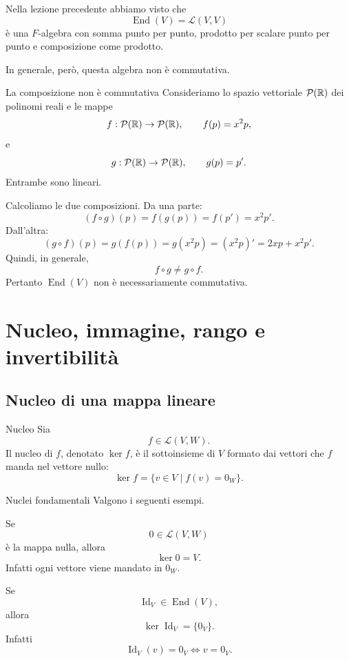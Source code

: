 \documentclass[a4paper]{article}
\begin{document}
Nella lezione precedente abbiamo visto che
\[
    \operatorname{End}(V)=\mathcal{L}(V,V)
\]
è una \(F\)-algebra con somma punto per punto, prodotto per scalare punto per punto e composizione come prodotto.

In generale, però, questa algebra non è commutativa.

\begin{snippetexample}{La composizione non è commutativa}
    Consideriamo lo spazio vettoriale \(\mathcal{P}(\mathbb{R})\) dei polinomi reali e le mappe
    \[
        f:\mathcal{P}(\mathbb{R})\to\mathcal{P}(\mathbb{R}),
        \qquad
        f(p)=x^2p,
    \]
    e
    \[
        g:\mathcal{P}(\mathbb{R})\to\mathcal{P}(\mathbb{R}),
        \qquad
        g(p)=p'.
    \]
    Entrambe sono lineari.

    Calcoliamo le due composizioni. Da una parte:
    \[
        (f\circ g)(p)
        =
        f(g(p))
        =
        f(p')
        =
        x^2p'.
    \]
    Dall'altra:
    \[
        (g\circ f)(p)
        =
        g(f(p))
        =
        g(x^2p)
        =
        (x^2p)'
        =
        2xp+x^2p'.
    \]
    Quindi, in generale,
    \[
        f\circ g\neq g\circ f.
    \]
    Pertanto \(\operatorname{End}(V)\) non è necessariamente commutativa.
\end{snippetexample}

\section{Nucleo, immagine, rango e invertibilità}

\subsection{Nucleo di una mappa lineare}

\begin{snippetdefinition}{Nucleo}
    Sia
    \[
        f\in\mathcal{L}(V,W).
    \]
    Il nucleo di \(f\), denotato \(\ker f\), è il sottoinsieme di \(V\) formato dai vettori che \(f\) manda nel vettore nullo:
    \[
        \ker f
        =
        \{v\in V\mid f(v)=0_W\}.
    \]
\end{snippetdefinition}

\begin{snippetexample}{Nuclei fondamentali}
    Valgono i seguenti esempi.

    Se
    \[
        0\in\mathcal{L}(V,W)
    \]
    è la mappa nulla, allora
    \[
        \ker 0=V.
    \]
    Infatti ogni vettore viene mandato in \(0_W\).

    Se
    \[
        \operatorname{Id}_V\in\operatorname{End}(V),
    \]
    allora
    \[
        \ker \operatorname{Id}_V=\{0_V\}.
    \]
    Infatti
    \[
        \operatorname{Id}_V(v)=0_V
        \Longleftrightarrow
        v=0_V.
    \]
\end{snippetexample}
\end{document}
